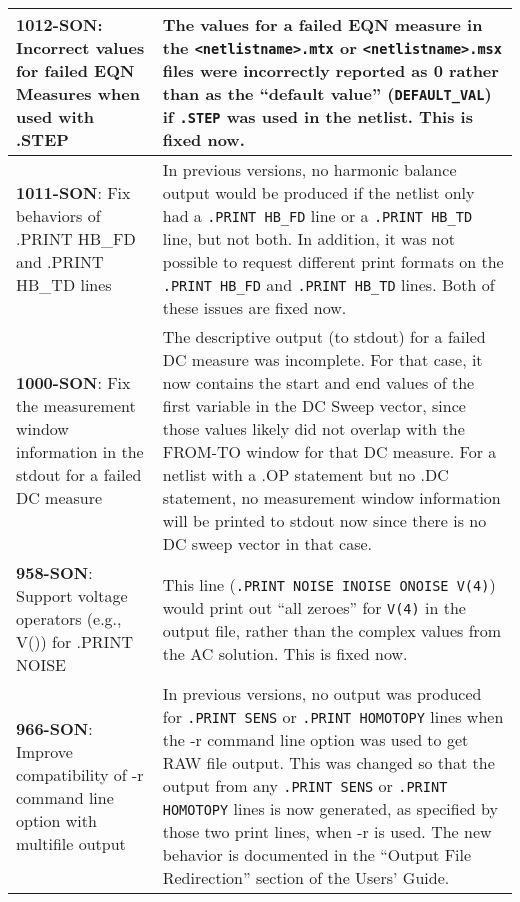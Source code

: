 {\begin{longtable}[h] {>{\raggedright\small}m{2in}|>{\raggedright\let\\\tabularnewline\small}m{3.5in}}
     \textbf{1012-SON}: Incorrect values for failed EQN Measures when 
     used with .STEP & The values for a failed EQN measure in the 
     \texttt{<netlistname>.mtx} or \texttt{<netlistname>.msx} files 
     were incorrectly reported as 0 rather than as the ``default 
     value'' (\texttt{DEFAULT\_VAL}) if \texttt{.STEP} was used in the 
     netlist.  This is fixed now.  \\ \hline

     \textbf{1011-SON}: Fix behaviors of .PRINT HB\_FD and .PRINT HB\_TD 
     lines &  In previous \Xyce{} versions, no harmonic balance output 
     would be produced if the netlist only had a \texttt{.PRINT HB\_FD} 
     line or a \texttt{.PRINT HB\_TD} line, but not both.  In addition, 
     it was not possible to request different print formats on the 
     \texttt{.PRINT HB\_FD} and \texttt{.PRINT HB\_TD} lines.  Both of 
     these issues are fixed now. \\ \hline

     \textbf{1000-SON}: Fix the measurement window information in the 
     stdout for a failed DC measure &  The descriptive output (to 
     stdout) for a failed DC measure was incomplete.  For that case, 
     it now contains the start and end values of the first variable 
     in the DC Sweep vector, since those values likely did not overlap 
     with the FROM-TO window for that DC measure. For a netlist with a 
     .OP statement but no .DC statement, no measurement window information 
     will be printed to stdout now since there is no DC sweep vector in 
     that case.\\ \hline

     \textbf{958-SON}: Support voltage operators (e.g., V()) for .PRINT 
     NOISE & This line (\texttt {.PRINT NOISE  INOISE ONOISE V(4)}) would 
     print out ``all zeroes'' for \texttt{V(4)} in the output file, rather 
     than the complex values from the AC solution.  This is fixed now.  
     \\ \hline

     \textbf{966-SON}: Improve compatibility of -r command line option 
     with multifile output &  In previous \Xyce{} versions, no output
     was produced for \texttt{.PRINT SENS} or \texttt{.PRINT HOMOTOPY}
     lines when the -r command line option was used to get RAW file 
     output.  This was changed so that the output from any 
     \texttt{.PRINT SENS} or \texttt{.PRINT HOMOTOPY} lines is now 
     generated, as specified by those two print lines, when -r is used.
     The new behavior is documented in the ``Output File Redirection'' section 
     of the \Xyce{} Users' Guide.
     \\ \hline


\end{longtable}}
